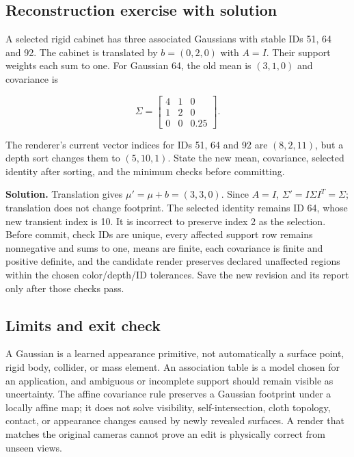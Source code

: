 \subsection{Reconstruction exercise with solution}\label{04-visual-computing-ii-ch039-reconstruction-exercise-with-solution}

\hypertarget{04-visual-computing-ii-ch039-reconstruction-exercise-with-solution}{}

A selected rigid cabinet has three associated Gaussians with stable IDs 51, 64 and 92. The cabinet is translated by \(b=(0,2,0)\) with \(A=I\). Their support weights each sum to one. For Gaussian 64, the old mean is \((3,1,0)\) and covariance is

\[
\Sigma=\begin{bmatrix}4&1&0\\1&2&0\\0&0&0.25\end{bmatrix}.
\]

The renderer's current vector indices for IDs 51, 64 and 92 are \((8,2,11)\), but a depth sort changes them to \((5,10,1)\). State the new mean, covariance, selected identity after sorting, and the minimum checks before committing.

\textbf{Solution.} Translation gives \(\mu' = \mu+b=(3,3,0)\). Since \(A=I\), \(\Sigma'=I\Sigma I^T=\Sigma\); translation does not change footprint. The selected identity remains ID 64, whose new transient index is 10. It is incorrect to preserve index 2 as the selection. Before commit, check IDs are unique, every affected support row remains nonnegative and sums to one, means are finite, each covariance is finite and positive definite, and the candidate render preserves declared unaffected regions within the chosen color/depth/ID tolerances. Save the new revision and its report only after those checks pass.

\subsection{Limits and exit check}\label{04-visual-computing-ii-ch039-limits-and-exit-check}

\hypertarget{04-visual-computing-ii-ch039-limits-and-exit-check}{}

A Gaussian is a learned appearance primitive, not automatically a surface point, rigid body, collider, or mass element. An association table is a model chosen for an application, and ambiguous or incomplete support should remain visible as uncertainty. The affine covariance rule preserves a Gaussian footprint under a locally affine map; it does not solve visibility, self-intersection, cloth topology, contact, or appearance changes caused by newly revealed surfaces. A render that matches the original cameras cannot prove an edit is physically correct from unseen views.

